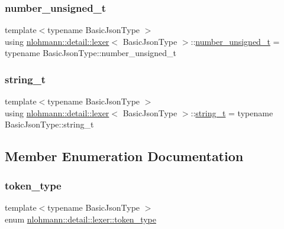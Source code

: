 \subsubsection{\texorpdfstring{number\+\_\+unsigned\+\_\+t}{number\_unsigned\_t}}
{\footnotesize\ttfamily template$<$typename Basic\+Json\+Type $>$ \\
using \hyperlink{classnlohmann_1_1detail_1_1lexer}{nlohmann\+::detail\+::lexer}$<$ Basic\+Json\+Type $>$\+::\hyperlink{classnlohmann_1_1detail_1_1lexer_a105d1dfeab414a572655895cdd96a52a}{number\+\_\+unsigned\+\_\+t} =  typename Basic\+Json\+Type\+::number\+\_\+unsigned\+\_\+t\hspace{0.3cm}{\ttfamily [private]}}

\mbox{\label{classnlohmann_1_1detail_1_1lexer_ab63d35c658887592a4b09ad26eb4c795}} 
\subsubsection{\texorpdfstring{string\+\_\+t}{string\_t}}
{\footnotesize\ttfamily template$<$typename Basic\+Json\+Type $>$ \\
using \hyperlink{classnlohmann_1_1detail_1_1lexer}{nlohmann\+::detail\+::lexer}$<$ Basic\+Json\+Type $>$\+::\hyperlink{classnlohmann_1_1detail_1_1lexer_ab63d35c658887592a4b09ad26eb4c795}{string\+\_\+t} =  typename Basic\+Json\+Type\+::string\+\_\+t\hspace{0.3cm}{\ttfamily [private]}}



\subsection{Member Enumeration Documentation}
\mbox{\label{classnlohmann_1_1detail_1_1lexer_a3f313cdbe187cababfc5e06f0b69b098}} 
\subsubsection{\texorpdfstring{token\+\_\+type}{token\_type}}
{\footnotesize\ttfamily template$<$typename Basic\+Json\+Type $>$ \\
enum \hyperlink{classnlohmann_1_1detail_1_1lexer_a3f313cdbe187cababfc5e06f0b69b098}{nlohmann\+::detail\+::lexer\+::token\+\_\+type}\hspace{0.3cm}{\ttfamily [strong]}}




